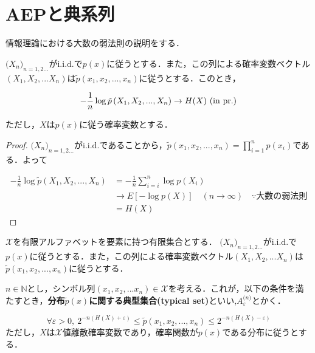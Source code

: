 \documentclass{classes/myclass}
\begin{document}
\section{AEPと典系列}

情報理論における大数の弱法則の説明をする．

\begin{thm}[AEP]
$\lparen X_n \rparen_{n = 1, 2...}$が$\mathrm{i.i.d.}$で$p(x)$に従うとする．また，この列による確率変数ベクトル$(X_1, X_2, ... X_n)$は$\tilde{p}(x_1, x_2, ..., x_n)$に従うとする．このとき，

\[
  -\frac{1}{n} \log \tilde{p}\left \lparen X_1, X_2, ..., X_n \right \rparen \rightarrow H(X) \ (\mathrm{in \ pr.})
\]

ただし，$X$は$p(x)$に従う確率変数とする．
\end{thm}

\begin{proof}
$\lparen X_n \rparen_{n = 1, 2...}$が$\mathrm{i.i.d.}$であることから，$\tilde{p}(x_1, x_2, ..., x_n) = \prod_{i = 1}^{n}p(x_i)$である．よって

\begin{align*}
  -\frac{1}{n} \log \tilde{p}(X_1, X_2, ..., X_n) &= -\frac{1}{n} \sum_{i = i}^{n} \log p(X_i) \label{form-num:check-identicality}\\
  &\rightarrow E[-\log p(X)] \quad (n \to \infty) \quad \because \text{大数の弱法則} \\
  &= H(X)
\end{align*}
\end{proof}


\begin{dfn}[典系列]
$\mathcal{X}$を有限アルファベットを要素に持つ有限集合とする．
$\lparen X_n \rparen_{n = 1, 2...}$が$\mathrm{i.i.d.}$で$p(x)$に従うとする．また，この列による確率変数ベクトル$(X_1, X_2, ... X_n)$は$\tilde{p}(x_1, x_2, ..., x_n)$に従うとする．

$n \in \mathbb{N}$とし，シンボル列$(x_1, x_2,... x_n) \in \mathcal{X}$を考える．これが，以下の条件を満たすとき，\textbf{分布$\tilde{p}(x)$に関する典型集合(typical set)}といい,$A_{\varepsilon}^{\lparen n \rparen}$とかく．

\[
  \forall \varepsilon > 0, \  2^{-n(H(X) + \varepsilon)} \leq \tilde{p}(x_1, x_2, ..., x_n) \leq  2^{-n(H(X) - \varepsilon)}
\]
ただし，$X$は$\mathcal{X}$値離散確率変数であり，確率関数が$p(x)$である分布に従うとする．
\end{dfn}
\end{document}
